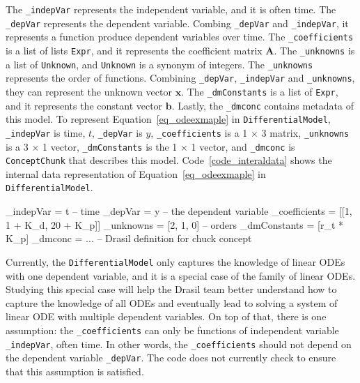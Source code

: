 The \verb|_indepVar| represents the independent variable, and it is often time. The \verb|_depVar| represents the dependent variable. Combing \verb|_depVar| and \verb|_indepVar|, it represents a function produce dependent variables over time. The \verb|_coefficients| is a list of lists \verb|Expr|, and it represents the coefficient matrix $\boldsymbol{A}$. The \verb|_unknowns| is a list of \verb|Unknown|, and \verb|Unknown| is a synonym of integers.
The \verb|_unknowns| represents the order of functions. Combining \verb|_depVar|, \verb|_indepVar| and \verb|_unknowns|, they can represent the unknown vector $\boldsymbol{x}$. The \verb|_dmConstants| is a list of \verb|Expr|, and it represents the constant vector $\boldsymbol{b}$. Lastly, the \verb|_dmconc| contains metadata of this model. To represent Equation~\ref{eq_odeexmaple} in \verb|DifferentialModel|, \verb|_indepVar| is time, $t$, \verb|_depVar| is $y$, \verb|_coefficients| is a 1 $\times$ 3 matrix, \verb|_unknowns| is a 3 $\times$ 1 vector, \verb|_dmConstants| is the 1 $\times$ 1 vector, and \verb|_dmconc| is \verb|ConceptChunk| that describes this model. Code~\ref{code_interaldata} shows the internal data representation of Equation~\ref{eq_odeexmaple} in \verb|DifferentialModel|.

\begin{listing}[ht]
\begin{haskell1}
_indepVar = t -- time
_depVar = y -- the dependent variable
_coefficients = [[1, 1 + K_d, 20 + K_p]]
_unknowns = [2, 1, 0] -- orders
_dmConstants = [r_t * K_p]
_dmconc = ... -- Drasil definition for chuck concept
\end{haskell1}
\label{code_interaldata}
\end{listing}

Currently, the \verb|DifferentialModel| only captures the knowledge of linear ODEs with one dependent variable, and it is a special case of the family of linear ODEs. Studying this special case will help the Drasil team better understand how to capture the knowledge of all ODEs and eventually lead to solving a system of linear ODE with multiple dependent variables. On top of that, there is one assumption: the \verb|_coefficients| can only be functions of independent variable \verb|_indepVar|, often time. In other words, the \verb|_coefficients| should not depend on the dependent variable \verb|_depVar|. The code does not currently check to ensure that this assumption is satisfied.

